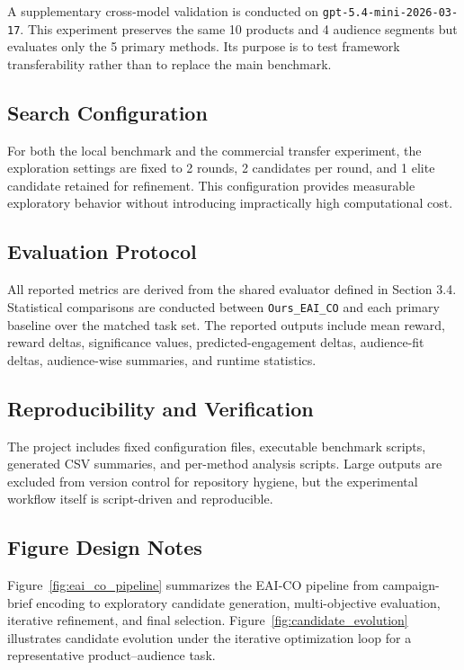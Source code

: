 \documentclass[applsci,article,submit,pdftex,moreauthors]{Definitions/mdpi}
\begin{document}
A supplementary cross-model validation is conducted on \texttt{gpt-5.4-mini-2026-03-17}. This experiment preserves the same 10 products and 4 audience segments but evaluates only the 5 primary methods. Its purpose is to test framework transferability rather than to replace the main benchmark.

\subsection{Search Configuration}

For both the local benchmark and the commercial transfer experiment, the exploration settings are fixed to 2 rounds, 2 candidates per round, and 1 elite candidate retained for refinement. This configuration provides measurable exploratory behavior without introducing impractically high computational cost.

\subsection{Evaluation Protocol}

All reported metrics are derived from the shared evaluator defined in Section 3.4. Statistical comparisons are conducted between \texttt{Ours\_EAI\_CO} and each primary baseline over the matched task set. The reported outputs include mean reward, reward deltas, significance values, predicted-engagement deltas, audience-fit deltas, audience-wise summaries, and runtime statistics.

\subsection{Reproducibility and Verification}

The project includes fixed configuration files, executable benchmark scripts, generated CSV summaries, and per-method analysis scripts. Large outputs are excluded from version control for repository hygiene, but the experimental workflow itself is script-driven and reproducible.

\subsection{Figure Design Notes}

Figure~\ref{fig:eai_co_pipeline} summarizes the EAI-CO pipeline from campaign-brief encoding to exploratory candidate generation, multi-objective evaluation, iterative refinement, and final selection. Figure~\ref{fig:candidate_evolution} illustrates candidate evolution under the iterative optimization loop for a representative product--audience task.
\end{document}
